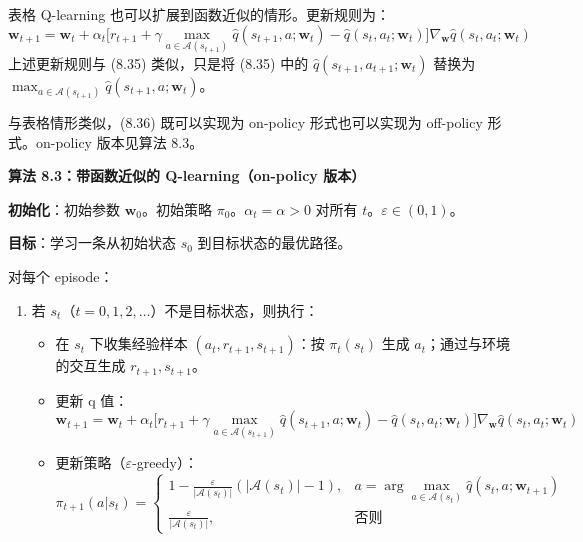 \documentclass[UTF8]{article}
\begin{document}
表格 Q-learning 也可以扩展到函数近似的情形。更新规则为：
\begin{equation}
\label{eq:ql_fa}
\boldsymbol{w}_{t+1} = \boldsymbol{w}_t + \alpha_t \big[r_{t+1} + \gamma \max_{a \in \mathcal{A}(s_{t+1})} \hat{q}(s_{t+1}, a; \boldsymbol{w}_t) - \hat{q}(s_t, a_t; \boldsymbol{w}_t)\big] \nabla_{\boldsymbol{w}} \hat{q}(s_t, a_t; \boldsymbol{w}_t)
\end{equation}
上述更新规则与 (8.35) 类似，只是将 (8.35) 中的 $\hat{q}(s_{t+1}, a_{t+1}; \boldsymbol{w}_t)$ 替换为 $\max_{a \in \mathcal{A}(s_{t+1})} \hat{q}(s_{t+1}, a; \boldsymbol{w}_t)$。

与表格情形类似，(8.36) 既可以实现为 on-policy 形式也可以实现为 off-policy 形式。on-policy 版本见算法 8.3。

\begin{remarkbox}
\textbf{算法 8.3：带函数近似的 Q-learning（on-policy 版本）}

\textbf{初始化}：初始参数 $\boldsymbol{w}_0$。初始策略 $\pi_0$。$\alpha_t = \alpha > 0$ 对所有 $t$。$\varepsilon \in (0, 1)$。

\textbf{目标}：学习一条从初始状态 $s_0$ 到目标状态的最优路径。

对每个 episode：
\begin{enumerate}
    \item 若 $s_t$（$t = 0, 1, 2, \dots$）不是目标状态，则执行：
    \begin{itemize}
        \item 在 $s_t$ 下收集经验样本 $(a_t, r_{t+1}, s_{t+1})$：按 $\pi_t(s_t)$ 生成 $a_t$；通过与环境的交互生成 $r_{t+1}, s_{t+1}$。
        \item 更新 q 值：
        \[
        \boldsymbol{w}_{t+1} = \boldsymbol{w}_t + \alpha_t \big[r_{t+1} + \gamma \max_{a \in \mathcal{A}(s_{t+1})} \hat{q}(s_{t+1}, a; \boldsymbol{w}_t) - \hat{q}(s_t, a_t; \boldsymbol{w}_t)\big] \nabla_{\boldsymbol{w}} \hat{q}(s_t, a_t; \boldsymbol{w}_t)
        \]
        \item 更新策略（$\varepsilon$-greedy）：
        \[
        \pi_{t+1}(a|s_t) = 
        \begin{cases}
        1 - \frac{\varepsilon}{|\mathcal{A}(s_t)|}(|\mathcal{A}(s_t)|-1), & a = \arg\max_{a \in \mathcal{A}(s_t)} \hat{q}(s_t, a; \boldsymbol{w}_{t+1}) \\
        \frac{\varepsilon}{|\mathcal{A}(s_t)|}, & \text{否则}
        \end{cases}
        \]
    \end{itemize}
\end{enumerate}
\end{remarkbox}
\end{document}
